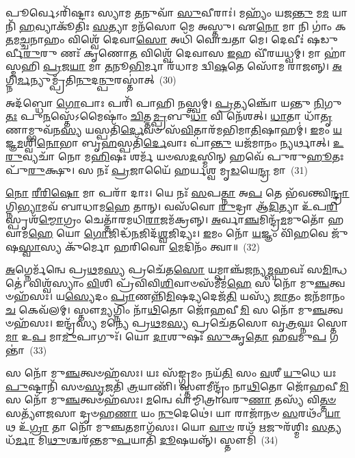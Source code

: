 𑌪𑍂𑌰𑍍𑌵𑍇\-𑌽𑌰𑌿᳴𑌷𑍍𑌟𑌾𑌃 𑌸𑍍𑌯𑌾𑌮 \ul{𑌤}\-𑌨𑍁𑌵𑌾᳴ \ul{𑌸𑍁}\-𑌵𑍀𑌰𑌾𑌃॑। 𑌮𑌹𑍍𑌯𑌂᳴ 𑌯𑌜\-\ul{𑌨𑍍𑌤𑍁} 𑌮\-\ul{𑌮} 𑌯𑌾𑌨𑌿᳴ \ul{𑌹}\-𑌵𑍍𑌯𑌾𑌕𑍂᳴𑌤𑌿𑌃 \ul{𑌸}\-𑌤𑍍𑌯𑌾 𑌮𑌨᳴𑌸𑍋 𑌮𑍇 𑌅𑌸𑍍𑌤𑍁। 𑌏\-\ul{𑌨𑍋} 𑌮𑌾 𑌨𑌿 𑌗𑌾𑌂॑ 𑌕\-\ul{𑌤}\-𑌮\-\ul{𑌚𑍍𑌚}\-𑌨𑌾𑌹𑌂 𑌵𑌿𑌶𑍍𑌵𑍇᳴ 𑌦𑍇𑌵𑌾\-\ul{𑌸𑍋} 𑌅𑌧𑌿᳴ 𑌵𑍋𑌚𑌤𑌾 𑌮𑍇। 𑌦𑍇𑌵𑍀𑌃॑ 𑌷𑌡𑍁𑌰𑍍𑌵𑍀\-\ul{𑌰𑍁}\-𑌰𑍁 𑌣𑌃᳴ 𑌕𑍃𑌣𑍋\-\ul{𑌤} 𑌵𑌿𑌶𑍍𑌵𑍇᳴ 𑌦𑍇𑌵𑌾𑌸 \ul{𑌇}\-𑌹 𑌵𑍀᳴𑌰𑌯𑌧𑍍𑌵𑌮𑍍। 𑌮𑌾 𑌹𑌾॑𑌸𑍍𑌮𑌹𑌿 \ul{𑌪𑍍𑌰}\-𑌜\-\ul{𑌯𑌾} 𑌮𑌾 \ul{𑌤}\-𑌨𑍂\-\ul{𑌭𑌿}\-𑌰𑍍𑌮𑌾 𑌰᳴𑌧𑌾𑌮 𑌦𑍍𑌵𑌿\-\ul{𑌷}\-𑌤𑍇 𑌸𑍋᳴𑌮 𑌰𑌾𑌜𑌨𑍍𑌨𑍍। \ul{𑌅}\-𑌗𑍍𑌨𑌿\-\ul{𑌰𑍍𑌮}\-𑌨𑍍𑌯𑍁𑌮𑍍𑌪𑍍𑌰᳴𑌤𑌿\-\ul{𑌨𑍁}\-𑌦\-\ul{𑌨𑍍𑌪𑍁}\-𑌰𑌸𑍍𑌤𑌾॑𑌤𑍍~(30)

𑌅𑌦᳴𑌬𑍍𑌧𑍋 \ul{𑌗𑍋}\-𑌪𑌾𑌃 𑌪𑌰𑌿᳴ 𑌪𑌾𑌹𑌿 \ul{𑌨}\-𑌸𑍍𑌤𑍍𑌵𑌮𑍍। \ul{𑌪𑍍𑌰}\-𑌤𑍍𑌯𑌞𑍍𑌚𑍋᳴ 𑌯𑌨𑍍𑌤𑍁 \ul{𑌨𑌿}\-𑌗𑍁\-\ul{𑌤𑌃} 𑌪𑍁\-\ul{𑌨}\-𑌸𑍍𑌤𑍇᳴\-𑌽𑌮𑍈𑌷𑌾𑌂॑ \ul{𑌚𑌿}\-𑌤𑍍𑌤\-\ul{𑌮𑍍𑌪𑍍𑌰}\-𑌬𑍁\-\ul{𑌧𑌾} 𑌵𑌿 𑌨𑍇᳴𑌶𑌤𑍍। \ul{𑌧𑌾}\-𑌤𑌾 𑌧𑌾᳴\-\ul{𑌤𑍃}\-𑌣𑌾𑌮𑍍𑌭𑍁𑌵᳴𑌨\-\ul{𑌸𑍍𑌯} 𑌯𑌸𑍍𑌪𑌤𑌿᳴\-\ul{𑌰𑍍𑌦𑍇}\-𑌵𑍞 𑌸᳴\-\ul{𑌵𑌿}\-𑌤𑌾𑌰᳴𑌮𑌭𑌿𑌮𑌾\-\ul{𑌤𑌿}\-𑌷𑌾𑌹𑌮𑍍॑। \ul{𑌇}\-𑌮𑌂 \ul{𑌯}\-𑌜𑍍𑌞\-\ul{𑌮}\-𑌶𑍍𑌵𑌿\-\ul{𑌨𑍋}\-𑌭𑌾 𑌬𑍃\-\ul{𑌹}\-𑌸𑍍𑌪𑌤𑌿᳴\-\ul{𑌰𑍍𑌦𑍇}\-𑌵𑌾𑌃 𑌪𑌾॑\-\ul{𑌨𑍍𑌤𑍁} 𑌯𑌜᳴𑌮𑌾𑌨𑌂 \ul{𑌨𑍍𑌯}\-𑌰𑍍𑌥𑌾𑌤𑍍। \ul{𑌉}\-\-\ul{𑌰𑍁}\-𑌵𑍍𑌯𑌚𑌾᳴ 𑌨𑍋 𑌮\-\ul{𑌹𑌿}\-𑌷𑌃 𑌶𑌰𑍍𑌮᳴ 𑌯𑍞𑌸\-\ul{𑌦}\-𑌸𑍍𑌮𑌿𑌨𑍍 𑌹𑌵𑍇᳴ 𑌪𑍁𑌰𑍁\-\ul{𑌹𑍂}\-𑌤𑌃 𑌪𑍁᳴\-\ul{𑌰𑍁}\-𑌕𑍍𑌷𑍁। 𑌸 𑌨𑌃᳴ \ul{𑌪𑍍𑌰}\-𑌜𑌾𑌯𑍈᳴ 𑌹𑌰𑍍𑌯𑌶𑍍𑌵 𑌮𑍃\-\ul{𑌡}\-𑌯𑍇\-\ul{𑌨𑍍𑌦𑍍𑌰} 𑌮𑌾~(31)

\-\ul{𑌨𑍋} \ul{𑌰𑍀}\-\-\ul{𑌰𑌿}\-\-\ul{𑌷𑍋} 𑌮𑌾 𑌪𑌰𑌾᳴ 𑌦𑌾𑌃। 𑌯𑍇 𑌨𑌃᳴ \ul{𑌸}\-𑌪\-\ul{𑌤𑍍𑌨𑌾} 𑌅\-\ul{𑌪} 𑌤𑍇 𑌭᳴𑌵𑌨𑍍𑌤𑍍𑌵𑌿\-\ul{𑌨𑍍𑌦𑍍𑌰𑌾}\-𑌗𑍍𑌨𑌿\-\ul{𑌭𑍍𑌯𑌾}\-𑌮𑌵᳴ 𑌬𑌾𑌧𑌾𑌮\-\ul{𑌹𑍇} 𑌤𑌾𑌨𑍍। 𑌵𑌸᳴𑌵𑍋 \ul{𑌰𑍁}\-𑌦𑍍𑌰𑌾 𑌆᳴\-\ul{𑌦𑌿}\-𑌤𑍍𑌯𑌾 𑌉᳴𑌪\-\ul{𑌰𑌿}\-𑌸𑍍𑌪𑍃𑌶᳴\-\ul{𑌮𑍍𑌮𑍋}\-𑌗𑍍𑌰𑌂 𑌚𑍇𑌤𑍍𑌤𑌾᳴𑌰𑌮𑌧𑌿\-\ul{𑌰𑌾}\-𑌜𑌮᳴𑌕𑍍𑌰𑌨𑍍𑌨𑍍। \ul{𑌅}\-𑌰𑍍𑌵𑌾\-\ul{𑌞𑍍𑌚}\-𑌮𑌿𑌨𑍍𑌦𑍍𑌰᳴\-\ul{𑌮}\-𑌮𑍁𑌤𑍋᳴ 𑌹𑌵𑌾𑌮\-\ul{𑌹𑍇} 𑌯𑍋 \ul{𑌗𑍋}\-𑌜𑌿𑌦𑍍𑌧᳴\-\ul{𑌨}\-𑌜𑌿𑌦᳴\-\ul{𑌶𑍍𑌵}\-𑌜𑌿𑌦𑍍𑌯𑌃। \ul{𑌇}\-𑌮𑌂 𑌨𑍋᳴ \ul{𑌯}\-𑌜𑍍𑌞𑌂 𑌵𑌿᳴\-\ul{𑌹}\-𑌵𑍇 𑌜𑍁᳴𑌷\-\ul{𑌸𑍍𑌵𑌾}\-𑌸𑍍𑌯 𑌕𑍁᳴𑌰𑍍𑌮𑍋 𑌹𑌰𑌿𑌵𑍋 \ul{𑌮𑍇}\-𑌦𑌿𑌨𑌂᳴ 𑌤𑍍𑌵𑌾॥~(32)

{\anuvakamend[{\-\ul{𑌵}\-\-\ul{𑌨𑌿}\-\-\ul{𑌷}\-\-\ul{𑌨𑍍𑌤} \ul{𑌪𑍁}\-𑌰\-\ul{𑌸𑍍𑌤𑌾}\-𑌨𑍍𑌮𑌾 𑌤𑍍𑌰𑌿𑌚᳴𑌤𑍍𑌵𑌾𑌰𑌿𑍞𑌶𑌚𑍍𑌚}]}%

\-\ul{𑌅}\-𑌗𑍍𑌨𑍇𑌰𑍍𑌮᳴𑌨𑍍𑌵𑍇 𑌪𑍍𑌰\-\ul{𑌥}\-𑌮\-\ul{𑌸𑍍𑌯} 𑌪𑍍𑌰𑌚𑍇᳴𑌤\-\ul{𑌸𑍋} 𑌯𑌮𑍍𑌪𑌾𑌞𑍍𑌚᳴𑌜𑌨𑍍𑌯\-\ul{𑌮𑍍𑌬}\-𑌹𑌵𑌃᳴ 𑌸\-\ul{𑌮𑌿}\-𑌨𑍍𑌧𑌤𑍇॑। 𑌵𑌿𑌶𑍍𑌵᳴𑌸𑍍𑌯𑌾𑌂 \ul{𑌵𑌿}\-𑌶𑌿 𑌪𑍍𑌰᳴𑌵𑌿𑌵𑌿\-\ul{𑌶𑌿}\-𑌵𑌾𑍞𑌸᳴𑌮𑍀𑌮\-\ul{𑌹𑍇} 𑌸 𑌨𑍋᳴ 𑌮𑍁\-\ul{𑌞𑍍𑌚}\-𑌤𑍍𑌵𑍞𑌹᳴𑌸𑌃। 𑌯\-\ul{𑌸𑍍𑌯𑍇}\-𑌦𑌂 \ul{𑌪𑍍𑌰𑌾}\-𑌣𑌨𑍍𑌨𑌿᳴\-\ul{𑌮𑌿}\-𑌷𑌦𑍍𑌯𑌦𑍇𑌜᳴\-\ul{𑌤𑌿} 𑌯𑌸𑍍𑌯᳴ \ul{𑌜𑌾}\-𑌤𑌂 𑌜𑌨᳴𑌮𑌾𑌨𑌂 \ul{𑌚} 𑌕𑍇𑌵᳴𑌲𑌮𑍍। 𑌸𑍍𑌤𑍗\-\ul{𑌮𑍍𑌯}\-𑌗𑍍𑌨𑌿𑌂 𑌨𑌾᳴\-\ul{𑌥𑌿}\-𑌤𑍋 𑌜𑍋᳴𑌹𑌵𑍀\-\ul{𑌮𑌿} 𑌸 𑌨𑍋᳴ 𑌮𑍁\-\ul{𑌞𑍍𑌚}\-𑌤𑍍𑌵𑍞𑌹᳴𑌸𑌃। 𑌇𑌨𑍍𑌦𑍍𑌰᳴𑌸𑍍𑌯 𑌮𑌨𑍍𑌯𑍇 𑌪𑍍𑌰\-\ul{𑌥}\-𑌮\-\ul{𑌸𑍍𑌯} 𑌪𑍍𑌰𑌚𑍇᳴𑌤𑌸𑍋 𑌵𑍃\-\ul{𑌤𑍍𑌰}\-𑌘𑍍𑌨𑌃 𑌸𑍍𑌤𑍋\-\ul{𑌮𑌾} 𑌉\-\ul{𑌪} 𑌮𑌾\-\ul{𑌮𑍁}\-𑌪𑌾𑌗𑍁𑌃᳴। 𑌯𑍋 \ul{𑌦𑌾}\-𑌶𑍁𑌷𑌃᳴ \ul{𑌸𑍁}\-𑌕𑍃\-\ul{𑌤𑍋} 𑌹\-\ul{𑌵}\-𑌮𑍁\-\ul{𑌪} 𑌗𑌨𑍍𑌤𑌾॑~(33)

𑌸 𑌨𑍋᳴ 𑌮𑍁\-\ul{𑌞𑍍𑌚}\-𑌤𑍍𑌵𑍞𑌹᳴𑌸𑌃। 𑌯𑌃 𑌸᳴𑌙𑍍𑌗𑍍𑌰𑌮𑌂 𑌨𑌯᳴\-\ul{𑌤𑌿} 𑌸𑌂 \ul{𑌵}\-𑌶𑍀 \ul{𑌯𑍁}\-𑌧𑍇 𑌯𑌃 \ul{𑌪𑍁}\-𑌷𑍍𑌟𑌾𑌨𑌿᳴ 𑌸𑍞\-\ul{𑌸𑍃}\-𑌜𑌤𑌿᳴ \ul{𑌤𑍍𑌰}\-𑌯𑌾𑌣𑌿᳴। 𑌸𑍍𑌤𑍗𑌮𑍀𑌨𑍍𑌦𑍍𑌰𑌂᳴ 𑌨𑌾\-\ul{𑌥𑌿}\-𑌤𑍋 𑌜𑍋᳴𑌹𑌵𑍀\-\ul{𑌮𑌿} 𑌸 𑌨𑍋᳴ 𑌮𑍁\-\ul{𑌞𑍍𑌚}\-𑌤𑍍𑌵𑍞𑌹᳴𑌸𑌃। \ul{𑌮}\-𑌨𑍍𑌵𑍇 𑌵𑌾॑𑌮𑍍𑌮𑌿𑌤𑍍𑌰𑌾𑌵𑌰𑍁\-\ul{𑌣𑌾} 𑌤𑌸𑍍𑌯᳴ 𑌵𑌿\-\ul{𑌤𑍍𑌤}\-\-\ul{𑍞} 𑌸𑌤𑍍𑌯𑍗᳴𑌜𑌸𑌾 𑌦𑍃𑍞𑌹\-\ul{𑌣𑌾} 𑌯𑌂 \ul{𑌨𑍁}\-𑌦𑍇𑌥𑍇॑। 𑌯𑌾 𑌰𑌾𑌜𑌾᳴𑌨𑍞 \ul{𑌸}\-𑌰𑌥𑌂᳴ \ul{𑌯𑌾}\-𑌥 𑌉᳴\-\ul{𑌗𑍍𑌰𑌾} 𑌤𑌾 𑌨𑍋᳴ 𑌮𑍁𑌞𑍍𑌚\-\ul{𑌤}\-𑌮𑌾𑌗᳴𑌸𑌃। 𑌯𑍋 \ul{𑌵𑌾}\-\-\ul{𑍞} 𑌰𑌥᳴ \ul{𑌋}\-𑌜𑍁𑌰᳴𑌶𑍍𑌮𑌿𑌃 \ul{𑌸}\-𑌤𑍍𑌯𑌧᳴\-\ul{𑌰𑍍𑌮𑌾} 𑌮𑌿\-\ul{𑌥𑍁}\-𑌶𑍍𑌚𑌰᳴𑌨𑍍𑌤𑌮𑍁\-\ul{𑌪}\-𑌯𑌾𑌤𑌿᳴ \ul{𑌦𑍂}\-𑌷𑌯𑌨𑍍𑌨𑍍᳴। 𑌸𑍍𑌤𑍗𑌮𑌿᳴~(34)

